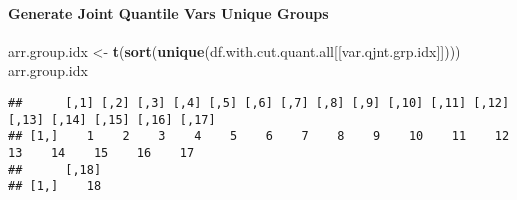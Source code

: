 \documentclass[
]{book}
\newenvironment{Shaded}{\begin{snugshade}}{\end{snugshade}}
\newcommand{\CommentTok}[1]{\textcolor[rgb]{0.56,0.35,0.01}{\textit{#1}}}
\newcommand{\DataTypeTok}[1]{\textcolor[rgb]{0.13,0.29,0.53}{#1}}
\newcommand{\KeywordTok}[1]{\textcolor[rgb]{0.13,0.29,0.53}{\textbf{#1}}}
\newcommand{\NormalTok}[1]{#1}
\newcommand{\OperatorTok}[1]{\textcolor[rgb]{0.81,0.36,0.00}{\textbf{#1}}}
\newcommand{\StringTok}[1]{\textcolor[rgb]{0.31,0.60,0.02}{#1}}
\begin{document}
\hypertarget{generate-joint-quantile-vars-unique-groups}{%
\paragraph{Generate Joint Quantile Vars Unique Groups}\label{generate-joint-quantile-vars-unique-groups}}

\begin{Shaded}
\end{Shaded}

\begin{Shaded}
\begin{Highlighting}[]
\NormalTok{arr.group.idx <-}\StringTok{ }\KeywordTok{t}\NormalTok{(}\KeywordTok{sort}\NormalTok{(}\KeywordTok{unique}\NormalTok{(df.with.cut.quant.all[[var.qjnt.grp.idx]])))}
\NormalTok{arr.group.idx}
\end{Highlighting}
\end{Shaded}

\begin{verbatim}
##      [,1] [,2] [,3] [,4] [,5] [,6] [,7] [,8] [,9] [,10] [,11] [,12] [,13] [,14] [,15] [,16] [,17]
## [1,]    1    2    3    4    5    6    7    8    9    10    11    12    13    14    15    16    17
##      [,18]
## [1,]    18
\end{verbatim}

\begin{Shaded}
\end{Shaded}
\end{document}
